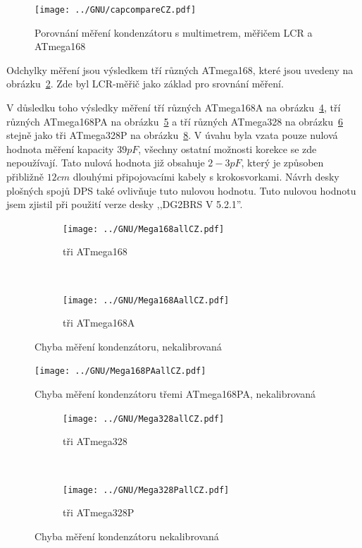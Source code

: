 \begin{figure}[H]
\centering
\texttt{[image: ../GNU/capcompareCZ.pdf]}
\caption{Porovnání měření kondenzátoru s multimetrem, měřičem LCR a ATmega168}
\label{fig:capcompare}
\end{figure}

Odchylky měření jsou výsledkem tří různých ATmega168, které jsou uvedeny na obrázku~\ref{fig:mega168all}.
Zde byl LCR-měřič jako základ pro srovnání měření.

V důsledku toho výsledky měření tří různých ATmega168A na obrázku~\ref{fig:mega168Aall}, 
tří různých ATmega168PA na obrázku~\ref{fig:mega168PAall}  a tří různých
ATmega328 na obrázku~\ref{fig:mega328all} stejně jako tři ATmega328P na obrázku~\ref{fig:mega328Pall}.
V úvahu byla vzata pouze nulová hodnota měření kapacity \(39pF\), všechny ostatní možnosti korekce se zde
nepoužívají.
Tato nulová hodnota již obsahuje \(2-3pF\), který je způsoben přibližně \(12cm\) dlouhými připojovacími kabely s krokosvorkami.
Návrh desky plošných spojů DPS také ovlivňuje tuto nulovou hodnotu.
Tuto nulovou hodnotu jsem zjistil při použití verze desky ,,DG2BRS V 5.2.1''.

\begin{figure}[H]
  \begin{subfigure}[b]{.5\textwidth}
    \centering
    \texttt{[image: ../GNU/Mega168allCZ.pdf]}
    \caption{tři ATmega168}
    \label{fig:mega168all}
  \end{subfigure}
  ~
  \begin{subfigure}[b]{.5\textwidth}
    \centering
    \texttt{[image: ../GNU/Mega168AallCZ.pdf]}
    \caption{tři ATmega168A}
    \label{fig:mega168Aall}
  \end{subfigure}
  \caption{Chyba měření kondenzátoru, nekalibrovaná}
\end{figure}

\begin{figure}[H]
\centering
\texttt{[image: ../GNU/Mega168PAallCZ.pdf]}
\caption{Chyba měření kondenzátoru třemi ATmega168PA, nekalibrovaná}
\label{fig:mega168PAall}
\end{figure}

\begin{figure}[H]
  \begin{subfigure}[b]{.5\textwidth}
    \centering
    \texttt{[image: ../GNU/Mega328allCZ.pdf]}
    \caption{tři ATmega328}
    \label{fig:mega328all}
  \end{subfigure}
  ~
  \begin{subfigure}[b]{.5\textwidth}
    \centering
    \texttt{[image: ../GNU/Mega328PallCZ.pdf]}
    \caption{tři ATmega328P}
    \label{fig:mega328Pall}
  \end{subfigure}
  \caption{Chyba měření kondenzátoru nekalibrovaná}
\end{figure}

